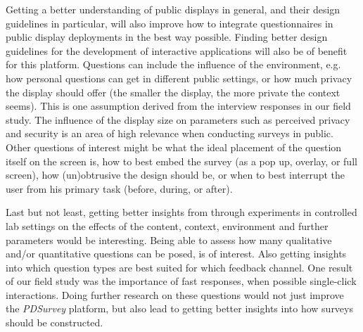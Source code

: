 Getting a better understanding of public displays in general, and their design guidelines in particular, will also improve how to integrate questionnaires in public display deployments in the best way possible. Finding better design guidelines for the development of interactive applications will also be of benefit for this platform. Questions can include the influence of the environment, e.g. how personal questions can get in different public settings, or how much privacy the display should offer (the smaller the display, the more private the context seems). This is one assumption derived from the interview responses in our field study. The influence of the display size on parameters such as perceived privacy and security is an area of high relevance when conducting surveys in public.
Other questions of interest might be what the ideal placement of the question itself on the screen is, how to best embed the survey (as a pop up, overlay, or full screen), how (un)obtrusive the design should be, or when to best interrupt the user from his primary task (before, during, or after).


Last but not least, getting better insights from through experiments in controlled lab settings on the effects of the content, context, environment and further parameters would be interesting. Being able to assess how many qualitative and/or quantitative questions can be posed, is of interest. Also getting insights into which question types are best suited for which feedback channel. One result of our field study was the importance of fast responses, when possible single-click interactions.
Doing further research on these questions would not just improve the \textit{PDSurvey} platform, but also lead to getting better insights into how surveys should be constructed.



